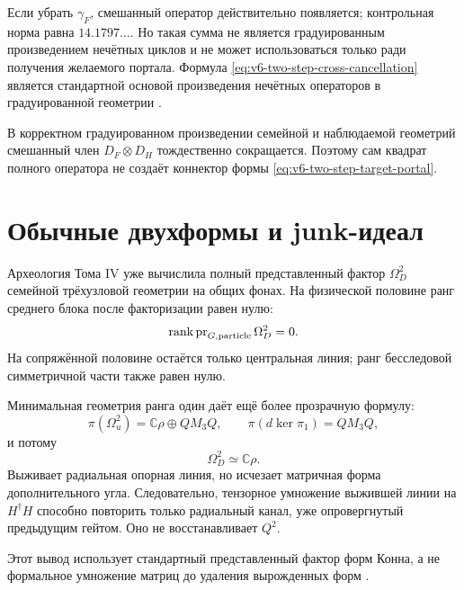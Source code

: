 Если убрать $\gamma_F$, смешанный оператор действительно появляется;
контрольная норма равна $14.1797\ldots$. Но такая сумма не является
градуированным произведением нечётных циклов и не может использоваться
только ради получения желаемого портала. Формула
\eqref{eq:v6-two-step-cross-cancellation} является стандартной основой
произведения нечётных операторов в градуированной геометрии
\cite{two-step-kucerovsky1997,two-step-quillen1985}.

\begin{theorem}
В корректном градуированном произведении семейной и наблюдаемой геометрий
смешанный член $D_F\otimes D_H$ тождественно сокращается. Поэтому сам
квадрат полного оператора не создаёт коннектор формы
\eqref{eq:v6-two-step-target-portal}.
\end{theorem}

\section{Обычные двухформы и junk-идеал}

Археология Тома IV уже вычислила полный представленный фактор
$\Omega_D^2$ семейной трёхузловой геометрии на общих фонах. На
физической половине ранг среднего блока после факторизации равен нулю:
\begin{equation}
 \operatorname{rank}\operatorname{pr}_{G,\rm particle}\Omega_D^2=0.
\end{equation}
На сопряжённой половине остаётся только центральная линия; ранг
бесследовой симметричной части также равен нулю.

Минимальная геометрия ранга один даёт ещё более прозрачную формулу:
\begin{equation}
 \pi(\Omega_u^2)=\mathbb C\rho\oplus QM_3Q,
 \qquad
 \pi(d\ker\pi_1)=QM_3Q,
\end{equation}
и потому
\begin{equation}
 \Omega_D^2\simeq\mathbb C\rho.
 \label{eq:v6-two-step-rank-one-quotient}
\end{equation}
Выживает радиальная опорная линия, но исчезает матричная форма
дополнительного угла. Следовательно, тензорное умножение выжившей линии
на $H^\dagger H$ способно повторить только радиальный канал, уже
опровергнутый предыдущим гейтом. Оно не восстанавливает $Q^2$.

Этот вывод использует стандартный представленный фактор форм Конна, а не
формальное умножение матриц до удаления вырожденных форм
\cite{two-step-schucker1996}.

